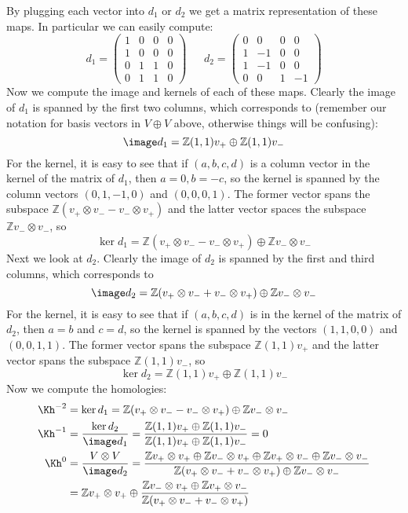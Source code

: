 By plugging each vector into $d_1$ or $d_2$ we get a matrix representation of these maps. In particular we can easily compute:
\[
d_1 = \left( 
			 	 \begin{array}{cccc} 
			 	 	 1 & 0 & 0 & 0 \\
			 	 	 1 & 0 & 0 & 0 \\
			 	 	 0 & 1 & 1 & 0 \\
			 	 	 0 & 1 & 1 & 0
			 	 \end{array} 
			\right)
\ \ \ \ \ \ \ 
d_2 = \left( 
			 	 \begin{array}{cccc} 
			 	 	 0 &  0 & 0 &  0 \\
			 	 	 1 & -1 & 0 &  0 \\
			 	 	 1 & -1 & 0 &  0 \\
			 	 	 0 &  0 & 1 & -1
			 	 \end{array} 
			\right)
\]
Now we compute the image and kernels of each of these maps. Clearly the image of $d_1$ is spanned by the first two columns, which corresponds to (remember our notation for basis vectors in $V \oplus V$ above, otherwise things will be confusing):
\[ \image d_1 = \mathbb Z(1,1)v_+ \oplus \mathbb Z(1,1)v_- \]
For the kernel, it is easy to see that if $(a,b,c,d)$ is a column vector in the kernel of the matrix of $d_1$, then $a=0,b=-c$, so the kernel is spanned by the column vectors $(0,1,-1,0)$ and $(0,0,0,1)$. The former vector spans the subspace $\mathbb Z (v_+ \otimes v_- - v_- \otimes v_+)$ and the latter vector spaces the subspace $\mathbb Z v_- \otimes v_-$, so
\[ \ker d_1 = \mathbb Z (v_+ \otimes v_- - v_- \otimes v_+) \oplus \mathbb Z v_- \otimes v_- \]
Next we look at $d_2$. Clearly the image of $d_2$ is spanned by the first and third columns, which corresponds to
\[ \image d_2 = \mathbb Z(v_+ \otimes v_- + v_- \otimes v_+) \oplus \mathbb Z v_- \otimes v_- \]
For the kernel, it is easy to see that if $(a,b,c,d)$ is in the kernel of the matrix of $d_2$, then $a = b$ and $c=d$, so the kernel is spanned by the vectors $(1,1,0,0)$ and $(0,0,1,1)$. The former vector spans the subspace $\mathbb Z (1,1)v_+$ and the latter vector spans the subspace $\mathbb Z (1,1)v_-$, so
\[ \ker d_2 = \mathbb Z(1,1)v_+ \oplus \mathbb Z(1,1)v_- \]
Now we compute the homologies:
\begin{align*}
\Kh^{-2} &= \ker d_1 = \mathbb Z (v_+ \otimes v_- - v_- \otimes v_+) \oplus \mathbb Z v_- \otimes v_- \\
\Kh^{-1} &= \frac{\ker d_2}{\image d_1} = \frac{\mathbb Z(1,1)v_+ \oplus \mathbb Z(1,1)v_-}{\mathbb Z(1,1)v_+ \oplus \mathbb Z(1,1)v_-} = 0 \\
\Kh^0    &= \frac{V \otimes V}{\image d_2} = \frac{\mathbb Z v_+ \otimes v_+ \oplus \mathbb Z v_- \otimes v_+ \oplus \mathbb Z v_+ \otimes v_- \oplus \mathbb Z v_- \otimes v_-}{\mathbb Z(v_+ \otimes v_- + v_- \otimes v_+) \oplus \mathbb Z v_- \otimes v_-} \\
         &= \mathbb Z v_+ \otimes v_+ \oplus \frac{\mathbb Z v_- \otimes v_+ \oplus \mathbb Z v_+ \otimes v_-}{\mathbb Z(v_+ \otimes v_- + v_- \otimes v_+)} 
\end{align*}
